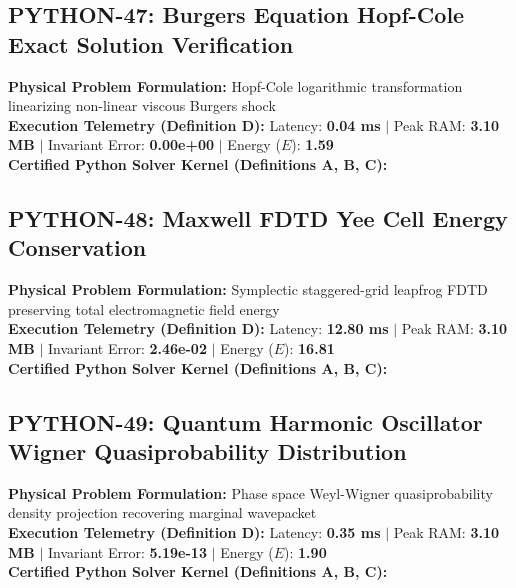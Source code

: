 \subsection{PYTHON-47: Burgers Equation Hopf-Cole Exact Solution Verification}
\textbf{Physical Problem Formulation:} Hopf-Cole logarithmic transformation linearizing non-linear viscous Burgers shock\\
\textbf{Execution Telemetry (Definition D):} Latency: \textbf{0.04 ms} $|$ Peak RAM: \textbf{3.10 MB} $|$ Invariant Error: \textbf{0.00e+00} $|$ Energy ($E$): \textbf{1.59}\\

\textbf{Certified Python Solver Kernel (Definitions A, B, C):}


\vspace{1em}
\subsection{PYTHON-48: Maxwell FDTD Yee Cell Energy Conservation}
\textbf{Physical Problem Formulation:} Symplectic staggered-grid leapfrog FDTD preserving total electromagnetic field energy\\
\textbf{Execution Telemetry (Definition D):} Latency: \textbf{12.80 ms} $|$ Peak RAM: \textbf{3.10 MB} $|$ Invariant Error: \textbf{2.46e-02} $|$ Energy ($E$): \textbf{16.81}\\

\textbf{Certified Python Solver Kernel (Definitions A, B, C):}


\vspace{1em}
\subsection{PYTHON-49: Quantum Harmonic Oscillator Wigner Quasiprobability Distribution}
\textbf{Physical Problem Formulation:} Phase space Weyl-Wigner quasiprobability density projection recovering marginal wavepacket\\
\textbf{Execution Telemetry (Definition D):} Latency: \textbf{0.35 ms} $|$ Peak RAM: \textbf{3.10 MB} $|$ Invariant Error: \textbf{5.19e-13} $|$ Energy ($E$): \textbf{1.90}\\

\textbf{Certified Python Solver Kernel (Definitions A, B, C):}


\vspace{1em}
